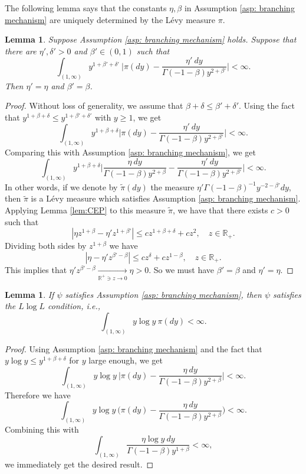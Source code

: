 \documentclass[12pt,a4paper]{amsart}
\theoremstyle{plain}
\newtheorem{lem}[thm]{Lemma}
\theoremstyle{definition}
\numberwithin{equation}{section}
\begin{document}
The following lemma says that the constants $\eta, \beta$ in Assumption \ref{asp: branching mechanism} are uniquely determined by the L\'evy measure $\pi$.
\begin{lem}
  \label{lem: unique of beta and eta}
  Suppose Assumption  \ref{asp: branching mechanism} holds. Suppose that there are $\eta', \delta'>0$ and $\beta'\in (0,1)$ such that
  \[
    \int_{(1,\infty)} y^{ 1 + \beta'  + \delta' }~ \Big| \pi(dy) - \frac {\eta' ~dy} {\Gamma (- 1 - \beta ) y^{2 + \beta'}} \Big|
    < \infty.
  \]
	Then $\eta'= \eta$ and $\beta ' = \beta$.
\end{lem}
\begin{proof}
	Without loss of generality, we assume that $\beta+\delta \leq \beta'+ \delta'$.
	Using  the fact that $y^{1+\beta+ \delta} \leq y^{1+\beta'+\delta'}$ with $y \geq 1$, we get
  \[
    \int_{(1, \infty)} y^{1 + \beta + \delta}   \Big| \pi(dy) - \frac {\eta' ~dy} {\Gamma( - 1 - \beta)y^{2 + \beta'}} \Big|
    < \infty .
  \]
	Comparing this with Assumption \ref{asp: branching mechanism}, we get
  \[
    \int_{(1,\infty)} y^{ 1 + \beta + \delta} \Big| \frac { \eta ~dy} {\Gamma (- 1 - \beta) y^{2 + \beta}} - \frac {\eta' ~dy} {\Gamma (- 1 - \beta) y^{2 + \beta'}} \Big| < \infty.
  \]
	In other words, if we denote by $\widetilde \pi(dy)$ the measure $\eta' \Gamma(-1-\beta)^{-1} y^{-2-\beta'} dy$, then $\widetilde \pi$ is a L\'evy measure which satisfies Assumption \ref{asp: branching mechanism}.
	Applying Lemma \ref{lem:CEP} to this measure $\widetilde \pi$, we have that there exists $c>0$ such that
  \[
    | \eta z^{ 1 + \beta } - \eta' z^{ 1 + \beta' } |
    \leq c z^{ 1 + \beta + \delta } + c z^2
    , \quad z \in \mathbb R_+.
  \]
  Dividing both sides by $z^{1+\beta}$ we have
  \[
    | \eta - \eta' z^{ \beta' - \beta } |
    \leq cz^{\delta}+cz^{1-\beta}
    ,	\quad z \in \mathbb R_+.
  \]
	This implies that $ \eta' z^{\beta' - \beta} \xrightarrow[\mathbb R^+\ni z\to 0]{} \eta >0. $
	So we must have $\beta'= \beta$ and $\eta'= \eta$.
\end{proof}
\begin{lem}
  \label{lem: LlogL criterion}
  If $\psi$ satisfies Assumption  \ref{asp: branching mechanism}, then $\psi$ satisfies the $L \log L$ condition, i.e.,
  \[
    \int_{(1,\infty)} y \log y~\pi(dy)
    < \infty.
  \]
\end{lem}
\begin{proof}
	Using  Assumption \ref{asp: branching mechanism} and the fact that $y\log y \leq y^{1+\beta+\delta}$ for $y$ large enough, we get
  \[
    \int_{(1,\infty)} y \log y ~\Big| \pi(dy) - \frac { \eta ~dy } { \Gamma ( - 1 - \beta ) y^{ 2 + \beta } } \Big|
    < \infty.
  \]
	Therefore we have
  \[
    \int_{ ( 1, \infty ) } y \log y ~\Big( \pi(dy) - \frac { \eta ~dy } { \Gamma ( - 1 - \beta ) y^{ 2 + \beta } } \Big)
    < \infty.
  \]
  Combining this with
  \[
    \int_{ ( 1, \infty ) } \frac { \eta \log y ~dy } { \Gamma ( - 1 - \beta ) y^{ 1 + \beta } }
    < \infty,
  \]
  we immediately get the desired result.
\end{proof}
\end{document}
